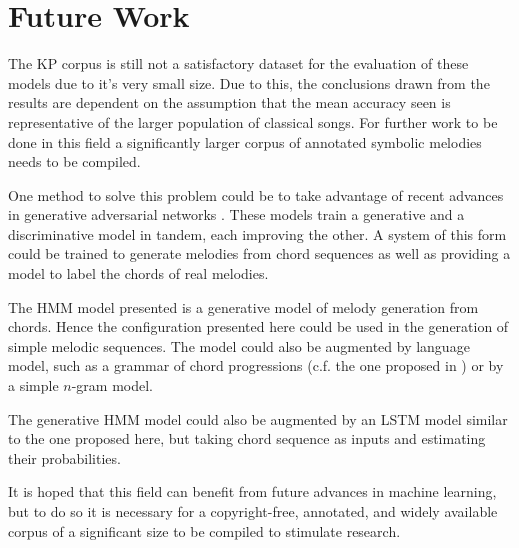 \documentclass[bsc,singlespacing,logo, parskip, deptreport]{infthesis}
\begin{document}
\section{Future Work}

The KP corpus is still not a satisfactory dataset for the evaluation of these models due to it's very small size. Due to this, the conclusions drawn from the results are dependent on the assumption that the mean accuracy seen is representative of the larger population of classical songs. For further work to be done in this field a significantly larger corpus of annotated symbolic melodies needs to be compiled.

One method to solve this problem could be to take advantage of recent advances in generative adversarial networks \cite{goodfellow2014generative}. These models train a generative and a discriminative model in tandem, each improving the other. A system of this form could be trained to generate melodies from chord sequences as well as providing a model to label the chords of real melodies.

The HMM model presented is a generative model of melody generation from chords. Hence the configuration presented here could be used in the generation of simple melodic sequences. The model could also be augmented by language model, such as a grammar of chord progressions (c.f. the one proposed in \cite{steedman1984generative}) or by a simple $n$-gram model.

The generative HMM model could also be augmented by an LSTM model similar to the one proposed here, but taking chord sequence as inputs and estimating their probabilities.

It is hoped that this field can benefit from future advances in machine learning, but to do so it is necessary for a copyright-free, annotated, and widely available corpus of a significant size to be compiled to stimulate research.



\end{document}
